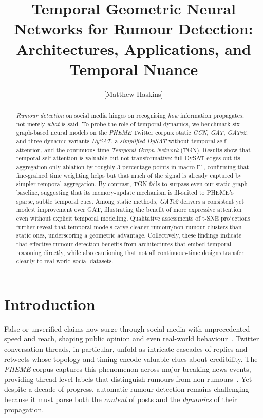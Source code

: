 \documentclass{cshonours}
\title{Temporal Geometric Neural Networks for Rumour Detection: Architectures, Applications, and Temporal Nuance}
\author{[Matthew Haskins]}
\begin{document}
\maketitle

\begin{abstract}

\emph{Rumour detection} on social media hinges on recognising \emph{how} information propagates, not merely \emph{what} is said. To probe the role of temporal dynamics, we benchmark six graph-based neural models on the \emph{PHEME} Twitter corpus: static \emph{GCN}, \emph{GAT}, \emph{GATv2}, and three dynamic variants-\emph{DySAT}, a \emph{simplified DySAT} without temporal self-attention, and the continuous-time \emph{Temporal Graph Network} (TGN). Results show that temporal self-attention is valuable but not transformative: full DySAT edges out its aggregation-only ablation by roughly 3 percentage points in macro-F1, confirming that fine-grained time weighting helps but that much of the signal is already captured by simpler temporal aggregation. By contrast, TGN fails to surpass even our static graph baseline, suggesting that its memory-update mechanism is ill-suited to PHEME's sparse, subtle temporal cues. Among static methods, \emph{GATv2} delivers a consistent yet modest improvement over GAT, illustrating the benefit of more expressive attention even without explicit temporal modelling. Qualitative assessments of t-SNE projections further reveal that temporal models carve cleaner rumour/non-rumour clusters than static ones, underscoring a geometric advantage. Collectively, these findings indicate that effective rumour detection benefits from architectures that embed temporal reasoning directly, while also cautioning that not all continuous-time designs transfer cleanly to real-world social datasets. 

\end{abstract}


\tableofcontents
\listoffigures

\chapter{Introduction}

False or unverified claims now surge through social media with unprecedented speed and reach, shaping public opinion and even real-world behaviour~\cite{vosoughi2018spread}.  Twitter conversation threads, in particular, unfold as intricate cascades of replies and retweets whose topology and timing encode valuable clues about credibility.  The \emph{PHEME} corpus captures this phenomenon across major breaking-news events, providing thread-level labels that distinguish rumours from non-rumours~\cite{zubiaga2016pheme}.  Yet despite a decade of progress, automatic rumour detection remains challenging because it must parse both the \emph{content} of posts and the \emph{dynamics} of their propagation.
\end{document}
